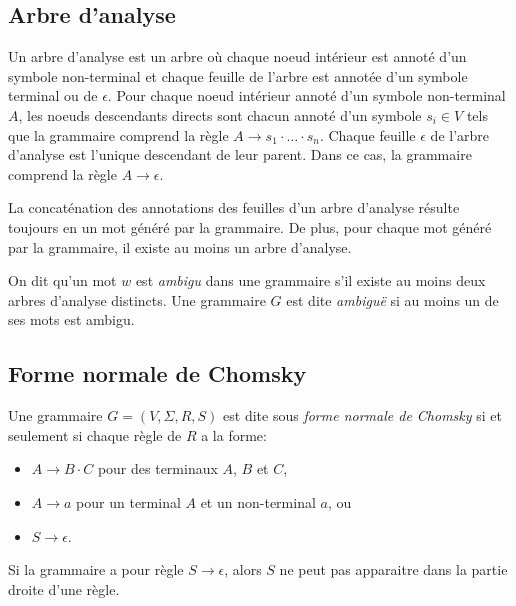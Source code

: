 \subsection{Arbre d'analyse}

Un arbre d'analyse est un arbre où chaque noeud intérieur est annoté d'un symbole non-terminal et chaque feuille de l'arbre est annotée d'un symbole terminal ou de $\epsilon$.
Pour chaque noeud intérieur annoté d'un symbole non-terminal $A$, les noeuds descendants directs sont chacun annoté d'un symbole $s_i \in V$ tels que la grammaire comprend la règle $A \to s_1 \cdot \ldots \cdot s_n$.
Chaque feuille $\epsilon$ de l'arbre d'analyse est l'unique descendant de leur parent. Dans ce cas, la grammaire comprend la règle $A \to \epsilon$.

La concaténation des annotations des feuilles d'un arbre d'analyse résulte toujours en un mot généré par la grammaire.
De plus, pour chaque mot généré par la grammaire, il existe au moins un arbre d'analyse.

On dit qu'un mot $w$ est \og \textit{ambigu} \fg{} dans une grammaire s'il existe au moins deux arbres d'analyse distincts.
Une grammaire $G$ est dite \og \textit{ambiguë} \fg{} si au moins un de ses mots est ambigu.

\subsection{Forme normale de Chomsky}

Une grammaire $G = (V, \Sigma, R, S)$ est dite sous \og \textit{forme normale de Chomsky} \fg{} si et seulement si chaque règle de $R$ a la forme:
\begin{itemize}
\item $A \to B \cdot C$ pour des terminaux $A$, $B$ et $C$,
\item $A \to a$ pour un terminal $A$ et un non-terminal $a$, ou
\item $S \to \epsilon$.
\end{itemize}
Si la grammaire a pour règle $S \to \epsilon$, alors $S$ ne peut pas apparaitre dans la partie droite d'une règle.

